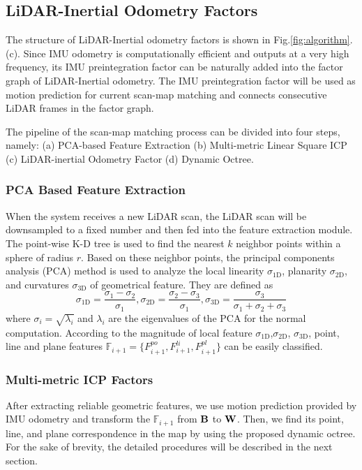 \subsection{LiDAR-Inertial Odometry Factors}
The structure of LiDAR-Inertial odometry factors is shown in Fig.\ref{fig:algorithm}.({c}). Since IMU odometry is computationally efficient and outputs at a very high frequency, its IMU preintegration factor can be naturally added into the factor graph of LiDAR-Inertial odometry. The IMU preintegration factor will be used as motion prediction for current scan-map matching and connects consecutive LiDAR frames in the factor graph. 


The pipeline of the scan-map matching process can be divided into four steps, namely: (a) PCA-based Feature Extraction (b) Multi-metric Linear Square ICP (c) LiDAR-inertial Odometry Factor (d) Dynamic Octree.

\subsubsection{\textbf{PCA Based Feature Extraction}}
When the system receives a new LiDAR scan, the LiDAR scan will be downsampled to a fixed number and then fed into the feature extraction module. The point-wise K-D tree is used to find the nearest $k$ neighbor points within a sphere of radius $r$. Based on these neighbor points, the principal components analysis (PCA) method is used to analyze the local linearity $\sigma_{1 \mathrm{D}}$, planarity $\sigma_{2 \mathrm{D}}$, and curvatures $\sigma_{3 \mathrm{D}}$ of geometrical feature. They are defined as\cite{hackel2016fast}
\begin{equation}
	\sigma_{1 \mathrm{D}}=\frac{\sigma_{1}-\sigma_{2}}{\sigma_{1}}, \sigma_{2 \mathrm{D}}=\frac{\sigma_{2}-\sigma_{3}}{\sigma_{1}}, \sigma_{3\mathrm{D}}=\frac{\sigma_{3}}{\sigma_{1}+\sigma_{2}+\sigma_{3}}
	\label{eq:feature}
\end{equation}
where $\sigma_{i}=\sqrt{\lambda_{i}}$ and $\lambda_{i}$ are the eigenvalues of the PCA for the normal computation. According to the magnitude of local feature $\sigma_{1 \mathrm{D}}$,$\sigma_{2 \mathrm{D}}$, $\sigma_{3 \mathrm{D}}$, point, line and plane features $\mathbb{F}_{i+1}=\{F^{po}_{i+1}, F^{li}_{i+1},F^{pl}_{i+1}\}$ can be easily classified.

\subsubsection{\textbf{Multi-metric ICP Factors}}
After extracting reliable geometric features,
we use motion prediction provided by IMU odometry and transform the $\mathbb{F}_{i+1}$ from $\bold{B}$ to $\bold{W}$. Then, we find its point, line, and plane correspondence in the map by using the proposed dynamic octree. For the sake of brevity, the detailed procedures will be described in the next section.


